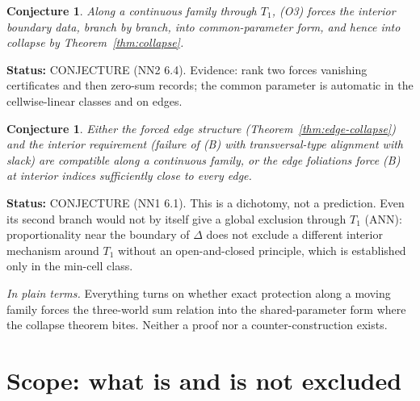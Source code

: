 \documentclass[11pt]{article}
\newtheorem{conjecture}[theorem]{Conjecture}
\theoremstyle{definition}
\theoremstyle{remark}
\newcommand{\src}[1]{\textsf{#1}}
\newcommand{\status}[1]{\par\smallskip\noindent\textbf{Status:} #1\par}
\newcommand{\inwords}[1]{\noindent\textit{In plain terms.} #1\par\smallskip}
\begin{document}
\begin{conjecture}\label{conj:NN2}
Along a continuous family through $T_1$, (O3) forces the interior boundary data, branch by branch, into common-parameter form, and hence into collapse by Theorem~\ref{thm:collapse}.
\end{conjecture}
\status{CONJECTURE (\src{NN2} 6.4). Evidence: rank two forces vanishing certificates and then zero-sum records; the common parameter is automatic in the cellwise-linear classes and on edges.}

\begin{conjecture}\label{conj:NN1}
Either the forced edge structure (Theorem~\ref{thm:edge-collapse}) and the interior requirement (failure of (B) with transversal-type alignment with slack) are compatible along a continuous family, or the edge foliations force (B) at interior indices sufficiently close to every edge.
\end{conjecture}
\status{CONJECTURE (\src{NN1} 6.1). This is a dichotomy, not a prediction. Even its second branch would not by itself give a global exclusion through $T_1$ (\src{ANN}): proportionality near the boundary of $\Delta$ does not exclude a different interior mechanism around $T_1$ without an open-and-closed principle, which is established only in the min-cell class.}
\inwords{Everything turns on whether exact protection along a moving family forces the three-world sum relation into the shared-parameter form where the collapse theorem bites. Neither a proof nor a counter-construction exists.}

\section{Scope: what is and is not excluded}\label{sec:scope}
\end{document}
